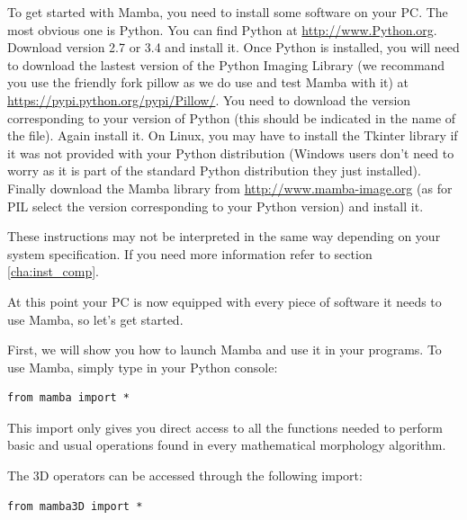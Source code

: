 \documentclass[a4paper,10pt,oneside]{article}
\begin{document}
To get started with Mamba, you need to install some software on your PC. The 
most obvious one is Python. You can find Python at \url{http://www.Python.org}. 
Download version 2.7 or 3.4 and install it. Once Python is installed, you will
need to download the lastest version of the Python Imaging Library (we
recommand you use the friendly fork pillow as we do use and test Mamba with it) at 
\url{https://pypi.python.org/pypi/Pillow/}.
You need to download the version corresponding to your version of Python (this
should be indicated in the name of the file). Again install it. On Linux, you may
have to install the Tkinter library if it was not provided with your Python
distribution (Windows users don't need to worry as it is part of the standard 
Python distribution they just installed). Finally download the Mamba library 
from \url{http://www.mamba-image.org} (as for PIL select the version corresponding
to your Python version) and install it.

These instructions may not be interpreted in the same way depending on your 
system specification. If you need more information refer to section
\ref{cha:inst_comp}.

At this point your PC is now equipped with every piece of software it needs to
use Mamba, so let's get started.

First, we will show you how to launch Mamba and use it in your programs.
To use Mamba, simply type in your Python console:

\lstset{language=Python}
\begin{lstlisting}
from mamba import * 
\end{lstlisting}

This import only gives you direct access to all the functions needed to 
perform basic and usual operations found in every mathematical
morphology algorithm.

The 3D operators can be accessed through the following import:

\lstset{language=Python}
\begin{lstlisting}
from mamba3D import *
\end{lstlisting}

\end{document}
